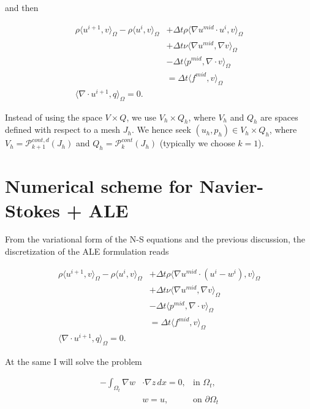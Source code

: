 \documentclass[11pt,a4paper,titlepage]{report}
\begin{document}
and then

\[
\begin{aligned}
\rho \langle u^{i+1},v \rangle_\Omega - \rho \langle u^i, v \rangle_\Omega & + \Delta t \rho \langle \nabla u^{mid} \cdot u^i  ,v \rangle_\Omega \\
& + \Delta t \nu \langle \nabla u^{mid}, \nabla v \rangle_\Omega \\
& - \Delta t \langle p^{mid} , \nabla \cdot v \rangle_\Omega \\
& = \Delta t \langle f^{mid} ,v \rangle_\Omega \\
\langle \nabla \cdot u^{i+1},q \rangle_\Omega  = 0.
\end{aligned}
\]

Instead of using the space $V \times Q$, we use $V_h \times Q_h$, where $V_h$ and $Q_h$ are spaces defined with respect to a mesh $J_h$. We hence seek $(u_h, p_h) \in V_h \times Q_h$, where $V_h = \mathcal{P}^{cont,d}_{k+1} (J_h)$ and $Q_h = \mathcal{P}^{cont}_{k} (J_h)$ (typically we choose $k=1$). \\

\section{Numerical scheme for Navier-Stokes + ALE}
From the variational form of the N-S equations and the previous discussion, the discretization of the ALE formulation reads

\[
\begin{aligned}
\rho \langle u^{i+1},v \rangle_\Omega - \rho \langle u^i, v \rangle_\Omega & + \Delta t \rho \langle \nabla u^{mid} \cdot (u^i -w^i)  ,v \rangle_\Omega \\
& + \Delta t \nu \langle \nabla u^{mid}, \nabla v \rangle_\Omega \\
& - \Delta t \langle p^{mid} , \nabla \cdot v \rangle_\Omega \\
& = \Delta t \langle f^{mid} ,v \rangle_\Omega \\
\langle \nabla \cdot u^{i+1},q \rangle_\Omega = 0.
\end{aligned}
\]

At the same I will solve the problem

\[
\begin{aligned}
-  \int_{\Omega_t} \nabla w & \cdot \nabla z \, dx = 0, & \text{in } \Omega_t, \\
& w = u, & \text{on } \partial \Omega_t
\end{aligned}
\]
\end{document}
